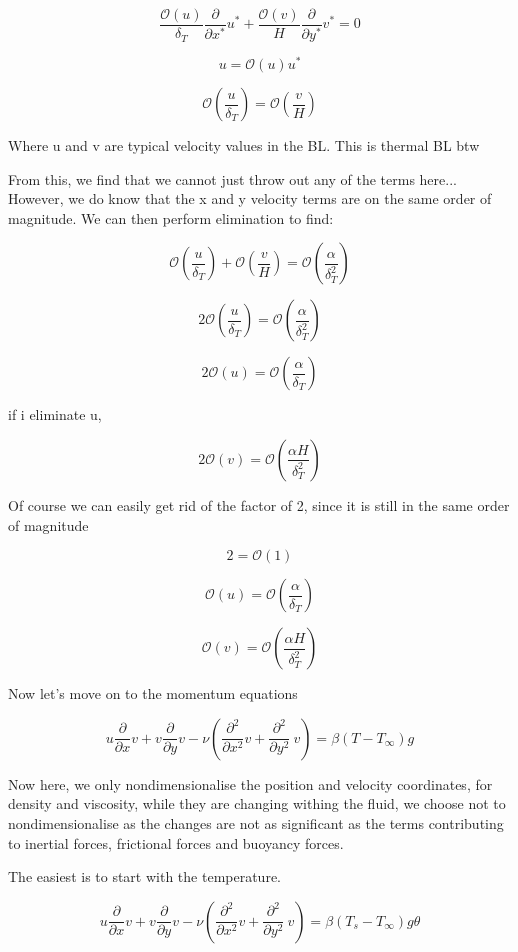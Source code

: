 \documentclass[11pt]{article}
\begin{document}
$$ \frac{\mathcal{O}(u)}{\delta_T} \frac{\partial}{\partial x^* } u^* + \frac{\mathcal{O}(v)}{H} \frac{\partial}{\partial y^*} v^*  = 0 $$

$$u=\mathcal{O}(u) u^*$$

$$\mathcal{O}(\frac{u}{\delta_T}) = \mathcal{O}(\frac{v}{H})$$

Where u and v are typical velocity values in the BL. This is thermal BL btw

From this, we find that we cannot just throw out any of the terms here... However, we do know that the x and y velocity terms are on the same order of magnitude. We can then perform elimination to find:

$$\mathcal{O}(  \frac{u}{\delta_T}) + \mathcal{O}( \frac{v}{H}) = \mathcal{O}(   \frac{\alpha}{\delta_T^2})$$

$$2 \mathcal{O}(  \frac{u}{\delta_T}) = \mathcal{O}(   \frac{\alpha}{\delta_T^2})$$

$$2 \mathcal{O}( u ) = \mathcal{O}(\frac{\alpha}{\delta_T})$$

if i eliminate u,

$$2 \mathcal{O}(v ) = \mathcal{O}( \frac{\alpha H}{\delta_T^2})$$

Of course we can easily get rid of the factor of 2, since it is still in the same order of magnitude

$$2 = \mathcal{O}(1)$$

$$ \mathcal{O}( u ) = \mathcal{O}(\frac{\alpha}{\delta_T})$$


$$ \mathcal{O}(v ) = \mathcal{O}( \frac{\alpha H}{\delta_T^2})$$

Now let's move on to the momentum equations

$$ u \frac{\partial}{\partial x} v +  v \frac{\partial}{\partial y} v  - \nu ( \frac{\partial^2}{\partial x^2} v + \frac{\partial^2}{\partial y^2} \ v ) = \beta(T-T_\infty)  g$$



Now here, we only nondimensionalise the position and velocity coordinates, for density and viscosity, while they are changing withing the fluid, we choose not to nondimensionalise as the changes are not as significant as the terms contributing to inertial forces, frictional forces and buoyancy forces.

The easiest is to start with the temperature.

$$ u \frac{\partial}{\partial x} v +  v \frac{\partial}{\partial y} v  -\nu ( \frac{\partial^2}{\partial x^2} v + \frac{\partial^2}{\partial y^2} \ v ) = \beta(T_s-T_\infty) g \theta $$
\end{document}
